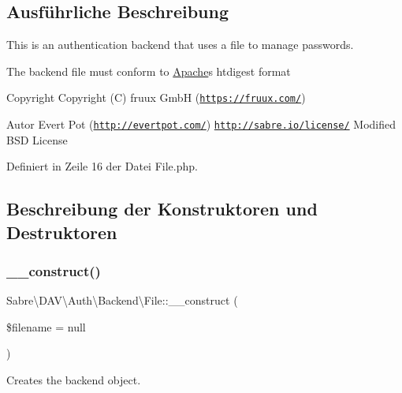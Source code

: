 \subsection{Ausführliche Beschreibung}
This is an authentication backend that uses a file to manage passwords.

The backend file must conform to \mbox{\hyperlink{class_sabre_1_1_d_a_v_1_1_auth_1_1_backend_1_1_apache}{Apache}}\textquotesingle{}s htdigest format

\begin{DoxyCopyright}{Copyright}
Copyright (C) fruux GmbH (\href{https://fruux.com/}{\tt https\+://fruux.\+com/}) 
\end{DoxyCopyright}
\begin{DoxyAuthor}{Autor}
Evert Pot (\href{http://evertpot.com/}{\tt http\+://evertpot.\+com/})  \href{http://sabre.io/license/}{\tt http\+://sabre.\+io/license/} Modified B\+SD License 
\end{DoxyAuthor}


Definiert in Zeile 16 der Datei File.\+php.



\subsection{Beschreibung der Konstruktoren und Destruktoren}
\mbox{\label{class_sabre_1_1_d_a_v_1_1_auth_1_1_backend_1_1_file_a9e267641e8da23b83338f7b27c2daef3}} 
\subsubsection{\texorpdfstring{\+\_\+\+\_\+construct()}{\_\_construct()}}
{\footnotesize\ttfamily Sabre\textbackslash{}\+D\+A\+V\textbackslash{}\+Auth\textbackslash{}\+Backend\textbackslash{}\+File\+::\+\_\+\+\_\+construct (\begin{DoxyParamCaption}\item[{}]{\$filename = {\ttfamily null} }\end{DoxyParamCaption})}

Creates the backend object.

